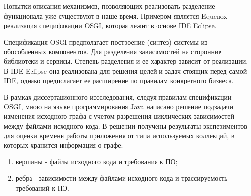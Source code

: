 
Попытки описания механизмов, позволяющих реализовать разделение функционала уже существуют в наше время. Примером является Equenox - реализация спецификации OSGI, которая лежит в основе IDE Eclipse.

Спецификация OSGI предполагает построение (синтез) системы из обособленных компонентов. Для разделения зависимостей на сторонние библиотеки и сервисы. Степень разделения и ее характер зависит от реализации. В IDE Eclipse она реализована для решения целей и задач стоящих перед самой IDE, однако предполагает ее расширение по правилам конкретного бизнеса.

В рамках диссертационного иссследования, следуя правилам спецификации OSGI, мною на языке программирования Java написано решение подзадачи изменения исходного графа с учетом разрешения циклических зависимостей между файлами исходного кода. В решении получены результаты экспериментов для оценки времени работы приложения от типа используемых коллекций, в которых хранится информация о графе:
\begin{enumerate}
    \item вершины - файлы исходного кода и требования к ПО;
    \item ребра - зависимости между файлами исходного кода и трассируемость требований к ПО.
\end{enumerate}


